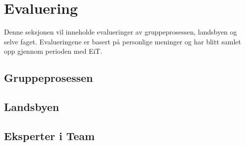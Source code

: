 \section{Evaluering}
Denne seksjonen vil inneholde evalueringer av gruppeprosessen, landsbyen
og selve faget. Evalueringene er basert på personlige meninger og har
blitt samlet opp gjennom perioden med EiT.
\subsection{Gruppeprosessen}

\subsection{Landsbyen}

\subsection{Eksperter i Team}

